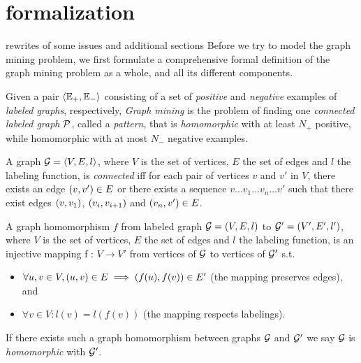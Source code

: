 \section{formalization}
rewrites of some issues and additional sections
Before we try to model the graph mining problem, we first formulate a comprehensive formal definition of the graph mining problem as a whole, and all its different components.

\begin{definition}
\label{def:GM1}
Given a pair $\langle \mathbb{E}_{+},\mathbb{E}_{-} \rangle$ consisting of a set of \emph{positive} and \emph{negative} examples of \emph{labeled graphs}, respectively,
\emph{Graph mining} is the problem of finding one \emph{connected labeled graph} $\mathcal{P}$, called a \emph{pattern},
that is \emph{homomorphic} with at least $N_{+}$ positive, while homomorphic with at most $N_{-}$ negative examples.
\end{definition}

\begin{definition}
A graph $\mathcal{G} = \langle V,E,l \rangle$, where $V$ is the set of vertices, $E$ the set of edges and $l$ the labeling function, is \emph{connected} iff for each pair of vertices $v$ and $v'$ in $V$, there exists an edge $\left(v,v'\right) \in E$ or there exists a sequence $v \ldots v_{1} \ldots v_{n} \ldots v'$ such that there exist edges $\left(v,v_{1}\right)$, $\left(v_{i},v_{i+1}\right)$ and $\left(v_{n},v'\right) \in E$.
\end{definition}


\begin{definition}
A graph homomorphism $f$ from labeled graph $\mathcal{G} = (V,E,l)$ to $\mathcal{G}' = (V',E',l')$, where $V$ is the set of vertices, $E$ the set of edges and $l$ the labeling function, is an injective mapping f : $V \rightarrow V'$ from vertices of $\mathcal{G}$ to vertices of $\mathcal{G'}$ s.t. 
\begin{itemize}
\item $\forall u,v \in V, \left(u,v\right) \in E \implies \left(f(u),f(v)\right) \in E'$ (the mapping preserves edges), and 
\item $\forall v \in V : l(v) = l(f(v))$ (the mapping respects labelings).
\end{itemize}
If there exists such a graph homomorphism between graphs $\mathcal{G}$ and $\mathcal{G'}$ we say $\mathcal{G}$ is \emph{homomorphic} with $\mathcal{G'}$.
\end{definition}

